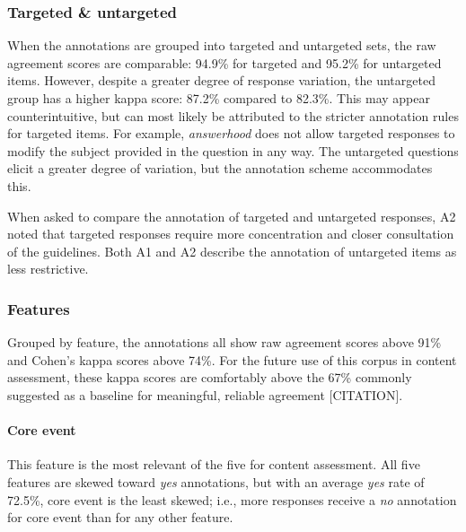\documentclass[11pt,a4paper]{article}
\begin{document}
\subsubsection{Targeted \& untargeted} When the annotations are grouped into targeted and untargeted sets, the raw agreement scores are comparable: 94.9\% for targeted and 95.2\% for untargeted items. However, despite a greater degree of response variation, the untargeted group has a higher kappa score: 87.2\% compared to 82.3\%.  This may appear counterintuitive, but can most likely be attributed to the stricter annotation rules for targeted items. For example, \textit{answerhood} does not allow targeted responses to modify the subject provided in the question in any way. The untargeted questions elicit a greater degree of variation, but the annotation scheme accommodates this. 

When asked to compare the annotation of targeted and untargeted responses, A2 noted that targeted responses require more concentration and closer consultation of the guidelines. Both A1 and A2 describe the annotation of untargeted items as less restrictive.

\subsubsection{Features} Grouped by feature, the annotations all show raw agreement scores above 91\% and Cohen's kappa scores above 74\%. For the future use of this corpus in content assessment, these kappa scores are comfortably above the 67\% commonly suggested as a baseline for meaningful, reliable agreement [CITATION].

\paragraph{Core event} This feature is the most relevant of the five for content assessment. All five features are skewed toward \textit{yes} annotations, but with an average \textit{yes} rate of 72.5\%, core event is the least skewed; i.e., more responses receive a \textit{no} annotation for core event than for any other feature.
\end{document}
